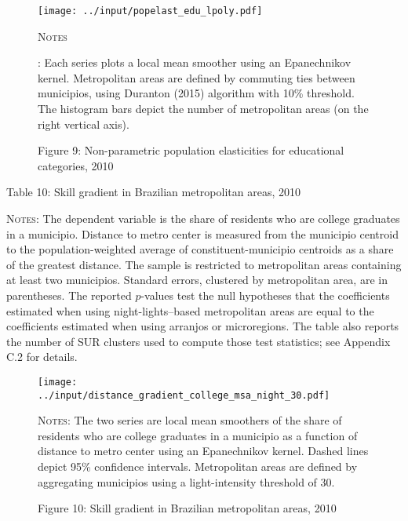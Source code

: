 \documentclass[11pt]{article}
\begin{document}
\begin{figure}[pbh]
\caption*{Figure 9: Non-parametric population elasticities for educational categories,
2010\label{fig:Brazil-edu-Non-parametric}}
\begin{centering}
\texttt{[image: ../input/popelast\_edu\_lpoly.pdf]}
\par\end{centering}
\centering{}%
\begin{minipage}[t]{0.8\textwidth}%
\textsc{\footnotesize{}Notes}{\footnotesize{}:
Each series plots a local mean smoother using an Epanechnikov kernel.
Metropolitan areas are defined by commuting ties between municipios, using Duranton (2015) algorithm with 10\% threshold.
The histogram bars depict the number of metropolitan areas (on the right vertical axis).\par}%
\end{minipage}
\end{figure}


\begin{table}[pht]
\caption*{Table 10: Skill gradient in Brazilian metropolitan areas, 2010}
\label{tab:skillgradient}
\begin{center}

\begin{minipage}{0.92\textwidth}
{\footnotesize \textsc{Notes}:
	The dependent variable is the share of residents who are college graduates in a municipio.
	Distance to metro center is measured from the municipio centroid to the population-weighted average of constituent-municipio centroids as a share of the greatest distance.
	The sample is restricted to metropolitan areas containing at least two municipios.
	Standard errors, clustered by metropolitan area, are in parentheses.
	The reported $p$-values test the null hypotheses that the coefficients estimated when using night-lights--based metropolitan areas are equal to the coefficients estimated when using arranjos or microregions.
	The table also reports the number of SUR clusters used to compute those test statistics;
	see Appendix C.2 for details.\par
}
\end{minipage}
\end{center}
\end{table}


\begin{figure}[phb]
\caption*{Figure 10: Skill gradient in Brazilian metropolitan areas, 2010}
\label{fig:skillgradient30}
\centering{} \texttt{[image: ../input/distance\_gradient\_college\_msa\_night\_30.pdf]}
\begin{minipage}{0.8\textwidth}
{\footnotesize \textsc{Notes}:
	The two series are local mean smoothers of the share of residents who are college graduates in a municipio as a function of distance to metro center using an Epanechnikov kernel.
	Dashed lines depict 95\% confidence intervals.
	Metropolitan areas are defined by aggregating municipios using a light-intensity threshold of 30.\par
}
\end{minipage}
\end{figure}
\end{document}

